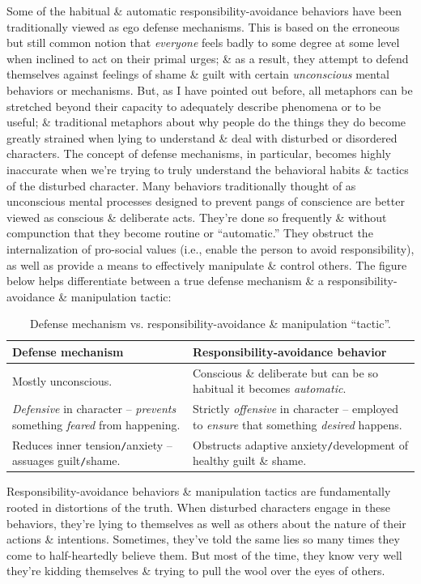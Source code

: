 \documentclass{article}
\numberwithin{equation}{section}
\begin{document}
Some of the habitual \& automatic responsibility-avoidance behaviors have been traditionally viewed as ego defense mechanisms. This is based on the erroneous but still common notion that \textit{everyone} feels badly to some degree at some level when inclined to act on their primal urges; \& as a result, they attempt to defend themselves against feelings of shame \& guilt with certain \textit{unconscious} mental behaviors or mechanisms. But, as I have pointed out before, all metaphors can be stretched beyond their capacity to adequately describe phenomena or to be useful; \& traditional metaphors about why people do the things they do become greatly strained when lying to understand \& deal with disturbed or disordered characters. The concept of defense mechanisms, in particular, becomes highly inaccurate when we're trying to truly understand the behavioral habits \& tactics of the disturbed character. Many behaviors traditionally thought of as unconscious mental processes designed to prevent pangs of conscience are better viewed as conscious \& deliberate acts. They're done so frequently \& without compunction that they become routine or ``automatic.'' They obstruct the internalization of pro-social values (i.e., enable the person to avoid responsibility), as well as provide a means to effectively manipulate \& control others. The figure below helps differentiate between a true defense mechanism \& a responsibility-avoidance \& manipulation tactic:
\begin{table}[H]
	\centering
	\begin{tabular}{|p{}|p{}|}
		\hline
		\textbf{Defense mechanism} & \textbf{Responsibility-avoidance behavior} \\
		\hline
		Mostly unconscious. & Conscious \& deliberate but can be so habitual it becomes \textit{automatic}. \\
		\hline
		\textit{Defensive} in character -- \textit{prevents} something \textit{feared} from happening. & Strictly \textit{offensive} in character -- employed to \textit{ensure} that something \textit{desired} happens. \\
		\hline
		Reduces inner tension\texttt{/}anxiety -- assuages guilt\texttt{/}shame. & Obstructs adaptive anxiety\texttt{/}development of healthy guilt \& shame. \\
		\hline
	\end{tabular}
	\caption{Defense mechanism vs. responsibility-avoidance \& manipulation ``tactic''.}
\end{table}
Responsibility-avoidance behaviors \& manipulation tactics are fundamentally rooted in distortions of the truth. When disturbed characters engage in these behaviors, they're lying to themselves as well as others about the nature of their actions \& intentions. Sometimes, they've told the same lies so many times they come to half-heartedly believe them. But most of the time, they know very well they're kidding themselves \& trying to pull the wool over the eyes of others.
\end{document}
